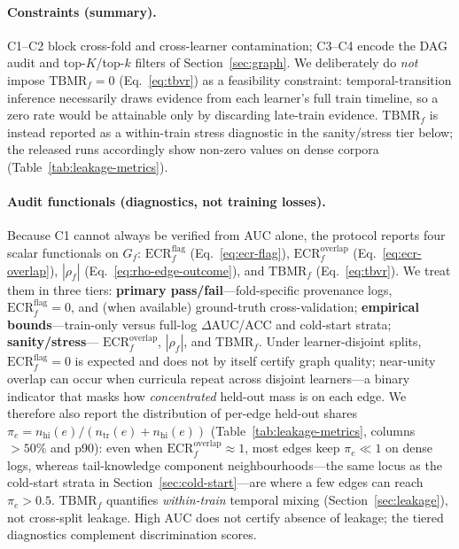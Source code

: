 \documentclass[pdflatex,sn-mathphys-num]{sn-jnl}
\newcommand{\KC}{knowledge component}
\begin{document}
\paragraph{Constraints (summary).}
C1--C2 block cross-fold and cross-learner contamination; C3--C4 encode
the DAG audit and top-$K$/top-$k$ filters of Section~\ref{sec:graph}.
We deliberately do \emph{not} impose $\mathrm{TBMR}_f{=}0$
(Eq.~\eqref{eq:tbvr}) as a feasibility constraint: temporal-transition
inference necessarily draws evidence from each learner's full train
timeline, so a zero rate would be attainable only by discarding
late-train evidence. $\mathrm{TBMR}_f$ is instead reported as a
within-train stress diagnostic in the sanity/stress tier below; the
released runs accordingly show non-zero values on dense corpora
(Table~\ref{tab:leakage-metrics}).

\paragraph{Audit functionals (diagnostics, not training losses).}
Because C1 cannot always be verified from AUC alone, the protocol
reports four scalar functionals on $G_f$:
$\mathrm{ECR}^{\mathrm{flag}}_f$ (Eq.~\eqref{eq:ecr-flag}),
$\mathrm{ECR}^{\mathrm{overlap}}_f$ (Eq.~\eqref{eq:ecr-overlap}),
$|\rho_f|$ (Eq.~\eqref{eq:rho-edge-outcome}), and
$\mathrm{TBMR}_f$ (Eq.~\eqref{eq:tbvr}). We treat them in three tiers:
\textbf{primary pass/fail}---fold-specific provenance logs,
$\mathrm{ECR}^{\mathrm{flag}}_f{=}0$, and (when available) ground-truth
cross-validation; \textbf{empirical bounds}---train-only versus full-log
$\Delta$AUC/ACC and cold-start strata; \textbf{sanity/stress}---
$\mathrm{ECR}^{\mathrm{overlap}}_f$, $|\rho_f|$, and $\mathrm{TBMR}_f$.
Under learner-disjoint splits, $\mathrm{ECR}^{\mathrm{flag}}_f{=}0$ is
expected and does not by itself certify graph quality; near-unity overlap
can occur when curricula repeat across disjoint learners---a binary indicator
that masks how \emph{concentrated} held-out mass is on each edge. We therefore
also report the distribution of per-edge held-out shares $\pi_e=n_{\mathrm{hi}}(e)/(n_{\mathrm{tr}}(e)+n_{\mathrm{hi}}(e))$
(Table~\ref{tab:leakage-metrics}, columns $>50\%$ and p90): even when
$\mathrm{ECR}^{\mathrm{overlap}}_f{\approx}1$, most edges keep $\pi_e\ll1$ on
dense logs, whereas tail-\KC{} neighbourhoods---the same locus as the cold-start
strata in Section~\ref{sec:cold-start}---are where a few edges can reach
$\pi_e>0.5$. $\mathrm{TBMR}_f$
quantifies \emph{within-train} temporal mixing (Section~\ref{sec:leakage}),
not cross-split leakage. High AUC does not certify absence of leakage; the
tiered diagnostics complement discrimination scores.
\end{document}
